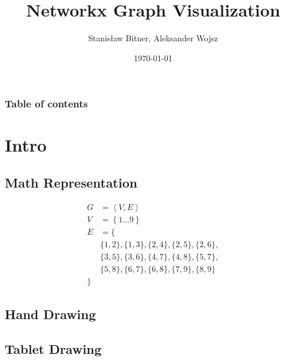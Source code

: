 \documentclass[11pt]{beamer}
\title{Networkx Graph Visualization}
\author{Stanisław Bitner, Aleksander Wojsz}
\date{\today}
\begin{document}
\frame{\titlepage}

\begin{frame}
    \frametitle{Table of contents}
    \tableofcontents[hideallsubsections]
\end{frame}

\section{Intro}

\subsection{Math Representation}
\begin{frame}{\subsecname}
    \begin{align*}
        G &= \left\langle V, E \right\rangle\\
        V &= \left\{ 1 \hdots 9 \right\}\\
        E &= \{\\
            &\{ 1, 2 \}, \{ 1, 3 \}, \{ 2, 4 \}, \{ 2, 5 \}, \{ 2, 6 \},\\
            &\{ 3, 5 \}, \{ 3, 6 \}, \{ 4, 7 \}, \{ 4, 8 \}, \{ 5, 7 \},\\
            &\{ 5, 8 \}, \{ 6, 7 \}, \{ 6, 8 \}, \{ 7, 9 \}, \{ 8, 9 \}\\
        \}
    \end{align*}
\end{frame}

\subsection{Hand Drawing}
\begin{frame}{\subsecname}
\end{frame}

\subsection{Tablet Drawing}
\begin{frame}{\subsecname}
\end{frame}
\end{document}
